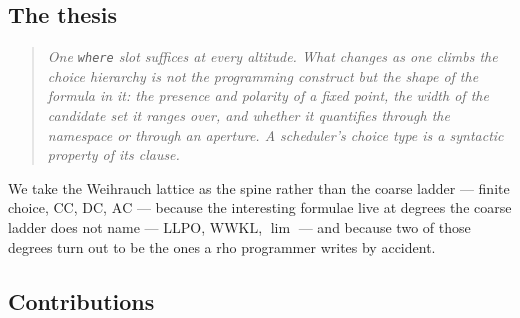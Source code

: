 \documentclass[11pt]{article}
\theoremstyle{definition}
\theoremstyle{plain}
\theoremstyle{remark}
\newcommand{\AC}{\mathrm{AC}}
\newcommand{\DC}{\mathrm{DC}}
\newcommand{\CC}{\mathrm{CC}}
\newcommand{\LLPO}{\mathrm{LLPO}}
\newcommand{\WWKL}{\mathrm{WWKL}}
\begin{document}
\subsection{The thesis}

\begin{quote}
\emph{One \texttt{where} slot suffices at every altitude. What changes as one climbs
the choice hierarchy is not the programming construct but the shape of the formula in
it: the presence and polarity of a fixed point, the width of the candidate set it
ranges over, and whether it quantifies through the namespace or through an aperture.
A scheduler's choice type is a syntactic property of its clause.}
\end{quote}

We take the Weihrauch lattice \cite{weihrauch} as the spine rather than the coarse
ladder --- finite choice, $\CC$, $\DC$, $\AC$ --- because the interesting formulae
live at degrees the coarse ladder does not name --- $\LLPO$, $\WWKL$, $\lim$ --- and because two of those
degrees turn out to be the ones a rho programmer writes by accident.

\subsection{Contributions}
\end{document}
